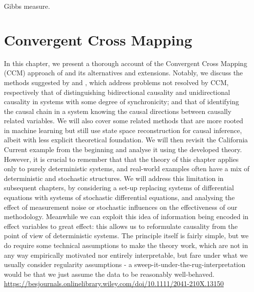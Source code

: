 \documentclass[11pt, a4paper]{memoir}
\theoremstyle{break}
\theoremstyle{break}
\theoremstyle{nonumberplain}
\begin{document}
Gibbs measure.


\chapter{Convergent Cross Mapping}\label{chapTaken}
In this chapter, we present a thorough account of the Convergent Cross Mapping (CCM) approach of \cite{Sugihara} and its alternatives and extensions. Notably, we discuss the methods suggested by \cite{Ye2015} and \cite{Leng2020}, which address problems not resolved by CCM, respectively that of distinguishing bidirectional causality and unidirectional causality in systems with some degree of synchronicity; and that of identifying the causal chain in a system knowing the causal directions between causally related variables. We will also cover some related methods that are more rooted in machine learning but still use state space reconstruction for causal inference, albeit with less explicit theoretical foundation. We will then revisit the California Current example from the beginning and analyse it using the developed theory. However, it is crucial to remember that that the theory of this chapter applies only to purely deterministic systems, and real-world examples often have a mix of deterministic and stochastic structures. We will address this limitation in subsequent chapters, by considering a set-up replacing systems of differential equations with systems of stochastic differential equations, and analysing the effect of measurement noise or stochastic influences on the effectiveness of our methodology.
Meanwhile we can exploit this idea of information being encoded in effect variables to great effect: this allows us to reformulate causality from the point of view of deterministic systems. The principle itself is fairly simple, but we do require some technical assumptions to make the theory work, which are not in any way empirically motivated nor entirely interpretable, but fare under what we usually consider regularity assumptions - a sweep-it-under-the-rug-interpretation would be that we just assume the data to be reasonably well-behaved. 
\url{https://besjournals.onlinelibrary.wiley.com/doi/10.1111/2041-210X.13150}
\end{document}
